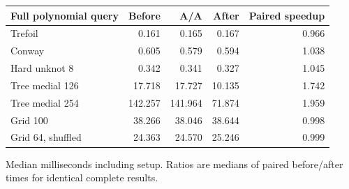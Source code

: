 \begin{center}\small
\begin{tabular}{@{}lrrrr@{}}
\toprule
Full polynomial query & Before & A/A & After & Paired speedup \\
\midrule
Trefoil & 0.161 & 0.165 & 0.167 & 0.966 \\
Conway & 0.605 & 0.579 & 0.594 & 1.038 \\
Hard unknot 8 & 0.342 & 0.341 & 0.327 & 1.045 \\
Tree medial 126 & 17.718 & 17.727 & 10.135 & 1.742 \\
Tree medial 254 & 142.257 & 141.964 & 71.874 & 1.959 \\
Grid 100 & 38.266 & 38.046 & 38.644 & 0.998 \\
Grid 64, shuffled & 24.363 & 24.570 & 25.246 & 0.999 \\
\bottomrule
\end{tabular}
\end{center}
Median milliseconds including setup. Ratios are medians of paired before/after times for identical complete results.
